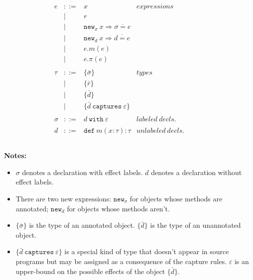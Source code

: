\documentclass{llncs}
\newcommand{\keywadj}[1]{\mathtt{#1}}
\newcommand{\keyw}[1]{\keywadj{#1}~}
\begin{document}
\[
\begin{array}{lll}

\begin{array}{lllr}

e & ::= & x & expressions \\
  		& | & r \\
		& | & \keywadj{new}_\sigma~x \Rightarrow \overline{\sigma = e} \\
 		& | & \keywadj{new}_d~x \Rightarrow \overline{d = e} \\
 		& | & e.m(e)\\
 		& | & e.\pi(e)\\
		&&\\

\tau & ::= & \{ \bar \sigma \} & types \\
		& | & \{ \bar r \} \\
		& | & \{ \bar d \} \\
		& | & \{ \bar d ~\keyw{captures} \varepsilon \} \\
		&&\\
		
\sigma & ::= & d~\keyw{with}\varepsilon  & labeled~ decls.\\
		&&\\

d & ::= & \keyw{def} m(x:\tau):\tau & unlabeled~decls.\\
		&&\\

\end{array}
& ~~~~~~
&
\end{array}
\]

\noindent \textbf{Notes:}
\begin{itemize}
	\item $\sigma$ denotes a declaration with effect labels. $d$ denotes a declaration without effect labels.
	\item There are two new expressions: $\keywadj{new}_\sigma$ for objects whose methods are annotated; $\keywadj{new}_d$ for objects whose methods aren't.
	\item $\{ \bar \sigma \}$ is the type of an annotated object. $\{ \bar d \}$ is the type of an unannotated object.
	\item $\{ \bar d ~\keyw{captures} \varepsilon \}$ is a special kind of type that doesn't appear in source programs but may be assigned as a consequence of the capture rules. $\varepsilon$ is an upper-bound on the possible effects of the object $\{ \bar d \}$.
\end{itemize}
\end{document}

